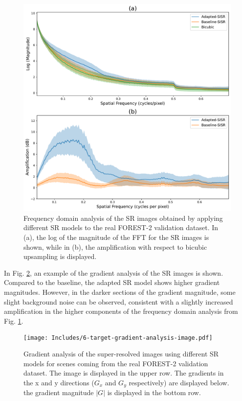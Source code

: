         \begin{figure}[H]
            \centering
            \includegraphics[scale=0.5]{Includes/5-target-amplification-statistics.pdf}
            \caption{Frequency domain analysis of the SR images obtained by applying different SR models to the real FOREST-2 validation dataset.
            In (a), the log of the magnitude of the FFT for the SR images is shown,
            while in (b), the amplification with respect to bicubic upsampling is displayed.}
            \label{fig:5-target-amplification-statistics}
        \end{figure}


        In Fig. \ref{fig:6-target-gradient-analysis-image}, an example of the gradient analysis of the SR images is shown. 
        Compared to the baseline, the adapted SR model shows higher gradient magnitudes. However, in the darker sections of the gradient magnitude, some slight background noise can be observed, consistent with a slightly increased amplification in the higher components of the frequency domain analysis from Fig. \ref{fig:5-target-amplification-statistics}.

        \begin{figure}[H]
            \centering
            \texttt{[image: Includes/6-target-gradient-analysis-image.pdf]}
            \caption{Gradient analysis of the super-resolved images using different SR models for scenes coming from the real FOREST-2 validation dataset.
                     The image is displayed in the upper row. The gradients in the x and y directions ($G_x$ and $G_y$ respectively) are displayed below.
                     the gradient magnitude $|G|$ is displayed in the bottom row.}
            \label{fig:6-target-gradient-analysis-image}
        \end{figure}

